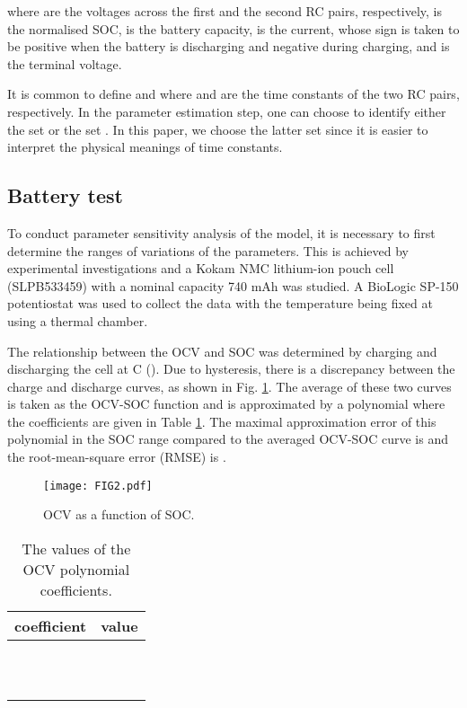 \documentclass[letterpaper,twocolumn]{IEEEtran}
\begin{document}
where  are the voltages across the first and the second RC pairs, respectively,  is the normalised SOC,  is the battery capacity,  is the current, whose sign is taken to be positive when the battery is discharging and negative during charging, and  is the terminal voltage.

It is common to define  and  where  and  are the time constants of the two RC pairs, respectively. In the parameter estimation step, one can choose to identify either the set  or the set . In this paper, we choose the latter set since it is easier to interpret the physical meanings of time constants.

\subsection{Battery test}
To conduct parameter sensitivity analysis of the model, it is necessary to first determine the ranges of variations of the parameters. This is achieved by experimental investigations and a Kokam NMC lithium-ion pouch cell (SLPB533459) with a nominal capacity 740 mAh was studied. A BioLogic SP-150 potentiostat was used to collect the data with the temperature being fixed at  using a thermal chamber.

The relationship between the OCV and SOC was determined by charging and discharging the cell at C ().
Due to hysteresis, there is a discrepancy between the charge and discharge curves, as shown in Fig. \ref{fig:Figure2}. The average of these two curves is taken as the OCV-SOC function and is approximated by a polynomial 
where the coefficients are given in Table \ref{tab:01}. The maximal approximation error of this polynomial in the SOC range  compared to the averaged OCV-SOC curve is  and the root-mean-square error (RMSE) is .

\begin{figure}
\centering
\texttt{[image: FIG2.pdf]}
\caption{OCV as a function of SOC.}
\label{fig:Figure2}
\end{figure}



\begin{table}
\centering
\caption{The values of the OCV polynomial coefficients.}
\begin{tabular}{|c|c|}
\hline
 coefficient & value \\
  \hline
 &  \\
   &  \\
   &  \\
   &  \\
   & \\
   &  \\
   &   \\
   &  \\
   &  \\
   &  \\
   &  \\
  \hline
\end{tabular}
\label{tab:01}
\end{table}
\end{document}
